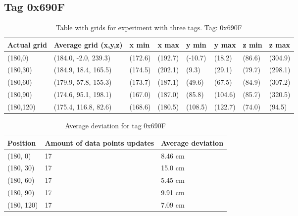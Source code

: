 \subsection{Tag 0x690F}
\begin{table}[H]
    \begin{tabular}{|l|l|l|l|l|l|l|l|}
        \hline
        Actual grid & Average grid (x,y,z) & x min   & x max   & y min   & y max   & z min  & z max   \\ \hline
        (180,0)     & (184.0, -2.0, 239.3) & (172.6) & (192.7) & (-10.7) & (18.2)  & (86.6) & (304.9) \\ \hline
        (180,30)    & (184.9, 18.4, 165.5) & (174.5) & (202.1) & (9.3)   & (29.1)  & (79.7) & (298.1) \\ \hline
        (180,60)    & (179.9, 57.8, 155.3) & (173.7) & (187.1) & (49.6)  & (67.5)  & (84.9) & (307.2) \\ \hline
        (180,90)    & (174.6, 95.1, 198.1) & (167.0) & (187.0) & (85.8)  & (104.6) & (85.7) & (320.5) \\ \hline
        (180,120)   & (175.4, 116.8, 82.6) & (168.6) & (180.5) & (108.5) & (122.7) & (74.0) & (94.5)  \\ \hline
    \end{tabular}
    \label{Tab:three-tag-experiment-result-tag-0x690F}
    \caption{Table with grids for experiment with three tags. Tag: 0x690F}
\end{table}

\begin{table}[H]
    \centering
    \begin{tabular}{|l|l|l|}
        \hline
        Position   & Amount of data points updates & Average deviation \\ \hline
        (180, 0)   & 17                            & 8.46 cm           \\ \hline
        (180, 30)  & 17                            & 15.0 cm           \\ \hline
        (180, 60)  & 17                            & 5.45 cm           \\ \hline
        (180, 90)  & 17                            & 9.91 cm           \\ \hline
        (180, 120) & 17                            & 7.09 cm           \\ \hline
    \end{tabular}
    \caption{Average deviation for tag 0x690F}
\end{table}

